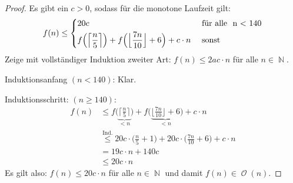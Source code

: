 \documentclass[a4paper,12pt]{article}
\DeclareMathOperator{\N}{\mathbb N}
\DeclareMathOperator{\BigO}{\mathcal O}
\theoremstyle{definition}
\begin{document}
	\begin{proof}
		Es gibt ein $c > 0$, sodass für die monotone Laufzeit gilt:
		\[
			f(n) \leq \begin{dcases*}
				20c & \text{ für alle } n < 140\\
				f\Big(\Big\lceil\frac{n}{5} \Big\rceil\Big) + f\Big(\Big\lfloor \frac{7n}{10}\Big\rfloor + 6\Big) + c\cdot n &\text{ sonst}
			\end{dcases*}
		\]
		Zeige mit vollständiger Induktion zweiter Art: $f(n) \leq 2ac \cdot n$ für alle $n \in \N$.
		
		Induktionsanfang $(n < 140)$: Klar.
		
		Induktionsschritt: $(n \geq 140)$: 
		\begin{align*}
			f(n) &\leq f\Big(\underbrace{\Big\lceil \frac{n}{5}\Big\rceil}_{< n}\Big) + f\Big(\underbrace{\Big\lfloor \frac{7n}{10}\Big\rfloor + 6}_{< n}\Big) + c\cdot n\\
			&\stackrel{\text{Ind.}}{\leq} 20c \cdot \Big(\frac{n}{5} + 1\Big) + 20c \cdot \Big(\frac{7n}{10} + 6\Big) + c\cdot n\\
			&= 19 c\cdot n + 140c\\
			&\leq 20c \cdot n
		\end{align*}
		Es gilt also: $f(n) \leq 20c \cdot n$ für alle $n \in \N$ und damit $f(n) \in \BigO(n)$.
	\end{proof}
\end{document}
